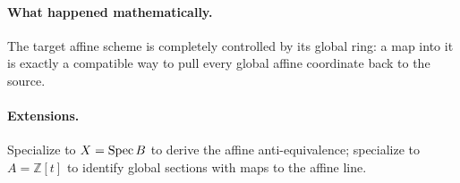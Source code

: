 \paragraph{What happened mathematically.}
The target affine scheme is completely controlled by its global ring: a map into it is exactly a compatible way to pull every global affine coordinate back to the source.

\paragraph{Extensions.}
Specialize to $X=\operatorname{Spec} B$ to derive the affine anti-equivalence; specialize to $A=\mathbb Z[t]$ to identify global sections with maps to the affine line.
\fi
